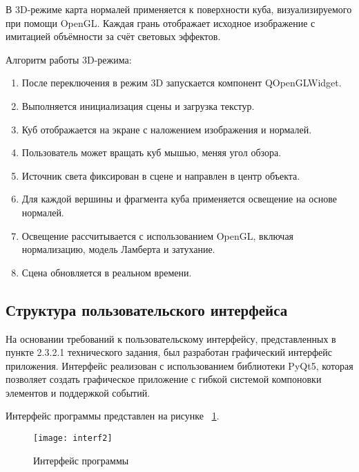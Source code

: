 В 3D-режиме карта нормалей применяется к поверхности куба, визуализируемого при помощи OpenGL. Каждая грань отображает исходное изображение с имитацией объёмности за счёт световых эффектов.

Алгоритм работы 3D-режима:
\begin{enumerate}
	\item После переключения в режим 3D запускается компонент QOpenGLWidget.
	\item Выполняется инициализация сцены и загрузка текстур.
	\item Куб отображается на экране с наложением изображения и нормалей.
	\item Пользователь может вращать куб мышью, меняя угол обзора.
	\item Источник света фиксирован в сцене и направлен в центр объекта.
	\item Для каждой вершины и фрагмента куба применяется освещение на основе нормалей.
	\item Освещение рассчитывается с использованием OpenGL, включая нормализацию, модель Ламберта и затухание.
	\item Сцена обновляется в реальном времени.
\end{enumerate}
\subsection{Структура пользовательского интерфейса}

На основании требований к пользовательскому интерфейсу, представленных в пункте 2.3.2.1 технического задания, был разработан графический интерфейс приложения. Интерфейс реализован с использованием библиотеки PyQt5, которая позволяет создать графическое приложение с гибкой системой компоновки элементов и поддержкой событий.

Интерфейс программы представлен на рисунке ~\ref{interf2:image}.

\begin{figure}[ht]
	\texttt{[image: interf2]}
	\caption{Интерфейс программы}
	\label{interf2:image}
\end{figure}

